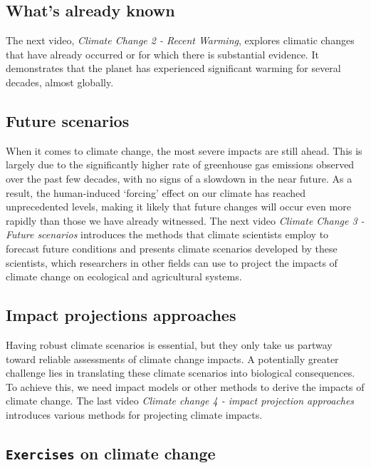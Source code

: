 \documentclass[
]{article}
\begin{document}
\subsection{What's already known}\label{whats-already-known}

The next video, \emph{Climate Change 2 - Recent Warming}, explores climatic changes that have already occurred or for which there is substantial evidence. It demonstrates that the planet has experienced significant warming for several decades, almost globally.

\subsection{Future scenarios}\label{future-scenarios}

When it comes to climate change, the most severe impacts are still ahead. This is largely due to the significantly higher rate of greenhouse gas emissions observed over the past few decades, with no signs of a slowdown in the near future. As a result, the human-induced `forcing' effect on our climate has reached unprecedented levels, making it likely that future changes will occur even more rapidly than those we have already witnessed. The next video \emph{Climate Change 3 - Future scenarios} introduces the methods that climate scientists employ to forecast future conditions and presents climate scenarios developed by these scientists, which researchers in other fields can use to project the impacts of climate change on ecological and agricultural systems.

\subsection{Impact projections approaches}\label{impact-projections-approaches}

Having robust climate scenarios is essential, but they only take us partway toward reliable assessments of climate change impacts. A potentially greater challenge lies in translating these climate scenarios into biological consequences. To achieve this, we need impact models or other methods to derive the impacts of climate change. The last video \emph{Climate change 4 - impact projection approaches} introduces various methods for projecting climate impacts.

\subsection{\texorpdfstring{\texttt{Exercises} on climate change}{Exercises on climate change}}\label{exercises-on-climate-change}
\end{document}
